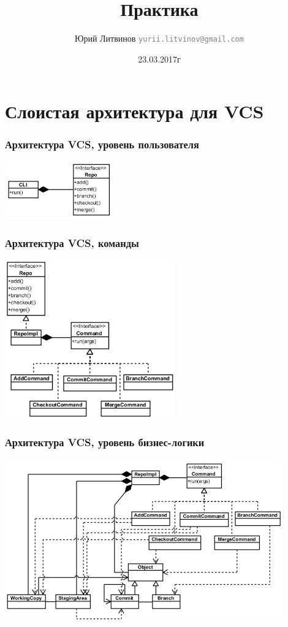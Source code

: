 \documentclass[xetex,mathserif,serif]{beamer}
\title{Практика}
\author[Юрий Литвинов]{Юрий Литвинов \newline \textcolor{gray}{\small\texttt{yurii.litvinov@gmail.com}}}
\date{23.03.2017г}
\begin{document}
	
	\frame{\titlepage}
	
	\section{Слоистая архитектура для VCS}

	\begin{frame}
		\frametitle{Архитектура VCS, уровень пользователя}
		\begin{center}
			\includegraphics[width=0.35\textwidth]{vcsInterfaceLevel.png}
		\end{center}
	\end{frame}

	\begin{frame}
		\frametitle{Архитектура VCS, команды}
		\begin{center}
			\includegraphics[width=0.55\textwidth]{vcsCommandsHierarchy.png}
		\end{center}
	\end{frame}

	\begin{frame}
		\frametitle{Архитектура VCS, уровень бизнес-логики}
		\begin{center}
			\includegraphics[width=0.9\textwidth]{vcsDomainModel.png}
		\end{center}
	\end{frame}
\end{document}
